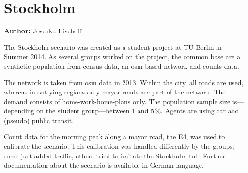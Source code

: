 \section{Stockholm}
\label{sec:stockholm}
\hfill \textbf{Author:} Joschka Bischoff

The Stockholm scenario was created as a student project at TU Berlin in Summer 2014. As several groups worked on the project, the common base are a synthetic population from census data, an \gls{osm} based network and counts data.

The network is taken from \gls{osm} data in 2013. Within the city, all roads are used, whereas in outlying regions only mayor roads are part of the network. The demand consists of home-work-home-plans only. The population sample size is---depending on the student group---between 1 and 5\,\%. Agents are using car and (pseudo) public transit.

Count data for the morning peak along a mayor road, the E4, was used to calibrate the scenario. This calibration was handled differently by the groups; some just added traffic, others tried to imitate the Stockholm toll. Further documentation about the scenario is available in German language. 

